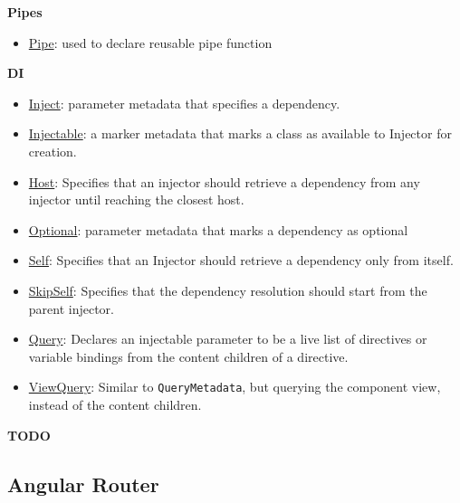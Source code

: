 \documentclass[12pt,]{article}
\providecommand{\tightlist}{%
  \setlength{\itemsep}{0pt}\setlength{\parskip}{0pt}}
\begin{document}
\textbf{Pipes}

\begin{itemize}
\tightlist
\item
  \href{https://angular.io/docs/ts/latest/api/core/PipeMetadata-class.html}{Pipe}:
  used to declare reusable pipe function
\end{itemize}

\textbf{DI}

\begin{itemize}
\tightlist
\item
  \href{https://angular.io/docs/ts/latest/api/core/InjectMetadata-class.html}{Inject}:
  parameter metadata that specifies a dependency.
\item
  \href{https://angular.io/docs/ts/latest/api/core/InjectableMetadata-class.html}{Injectable}:
  a marker metadata that marks a class as available to Injector for
  creation.
\item
  \href{https://angular.io/docs/ts/latest/api/core/HostMetadata-class.html}{Host}:
  Specifies that an injector should retrieve a dependency from any
  injector until reaching the closest host.
\item
  \href{https://angular.io/docs/ts/latest/api/core/OptionalMetadata-class.html}{Optional}:
  parameter metadata that marks a dependency as optional
\item
  \href{https://angular.io/docs/ts/latest/api/core/SelfMetadata-class.html}{Self}:
  Specifies that an Injector should retrieve a dependency only from
  itself.
\item
  \href{https://angular.io/docs/ts/latest/api/core/SkipSelfMetadata-class.html}{SkipSelf}:
  Specifies that the dependency resolution should start from the parent
  injector.
\item
  \href{https://angular.io/docs/ts/latest/api/core/QueryMetadata-class.html}{Query}:
  Declares an injectable parameter to be a live list of directives or
  variable bindings from the content children of a directive.
\item
  \href{https://angular.io/docs/ts/latest/api/core/ViewQueryMetadata-class.html}{ViewQuery}:
  Similar to \texttt{QueryMetadata}, but querying the component view,
  instead of the content children.
\end{itemize}

\textbf{TODO}

\subsection{Angular Router}\label{angular-router}
\end{document}
